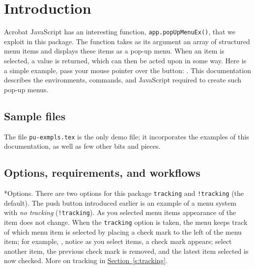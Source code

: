 \documentclass{article}
\makeatletter
\let\opt\texttt
\renewcommand*{\theparagraph}{\texorpdfstring{\protect\P\protect\ }{\textparagraph}}
\renewcommand{\paragraph}
    {\renewcommand{\@seccntformat}[1]{\theparagraph}%
    \@startsection{paragraph}{4}{0pt}{6pt}{-3pt}{\bfseries}} %
\def\FmtMP#1{\marginpar{\slshape\raggedleft\small#1}}
\makeatother
\begin{document}
\maketitle

\tableofcontents
{}

\section{Introduction}\label{s:intro}

Acrobat JavaScript has an interesting function, \texttt{app.popUpMenuEx()},
that we exploit in this package. The function takes as its argument an array
of structured menu items and displays these items as a pop-up menu. When an
item is selected, a value is returned, which can then be acted upon in some
way. Here is a simple example, pass your mouse pointer over the button:
\olBdry. This
documentation describes the environments, commands, and JavaScript required
to create such pop-up menus.

\subsection{Sample files}

The file \texttt{pu-exmpls.tex} is the only demo file; it incorporates the examples of this
documentation, as well as few other bits and pieces.

\subsection{Options, requirements, and workflows}

\paragraph*{Options.} There are two options for this package
\opt{tracking}\FmtMP{\opt{tracking}} and \opt{!tracking} (the default). The
push button  introduced earlier is an example of a menu system with
  \emph{no tracking} (\opt{!tracking}). As you selected menu items appearance
  of the item does not change. When the \opt{tracking} option is taken, the
  menu keeps track of which menu item is selected by placing a check mark to
  the left of the menu item; for example,
  \olBdry, notice as you select items, a
  check mark appears; select another item, the previous check mark is removed,
  and the latest item selected is now checked. More on tracking in \hyperref[s:tracking]{Section~\ref*{s:tracking}}.
\end{document}
